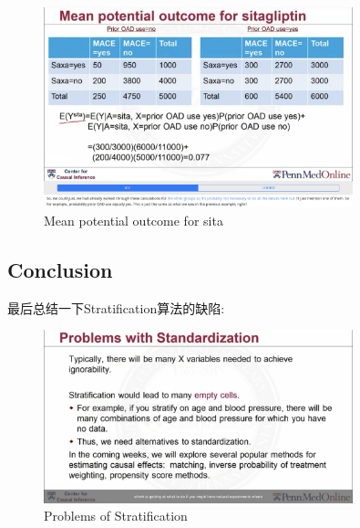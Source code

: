 	 \begin{figure}[htbp]
	 \setlength{\abovecaptionskip}{0pt}     %
	 \setlength{\belowcaptionskip}{10pt}
	 \vspace{-0cm}  %
	 \setlength{\abovecaptionskip}{-0cm}   %
	 \setlength{\belowcaptionskip}{-0cm}   %
	 \centering
     \includegraphics[width=0.8\textwidth]{figure/meansita.jpg} 
     \caption{Mean potential outcome for sita}
     \label{meansita}
     \end{figure}           
\subsection{Conclusion}
最后总结一下Stratification算法的缺陷:

\begin{figure}[h]
	\setlength{\abovecaptionskip}{0pt}     %
	\setlength{\belowcaptionskip}{10pt}
	\vspace{-0cm}  %
	\setlength{\abovecaptionskip}{-0cm}   %
	\centering
	\includegraphics[width=0.8\textwidth]{figure/strtprm.jpg}
	\caption{Problems of Stratification}
	\label{strtprm}
\end{figure}

